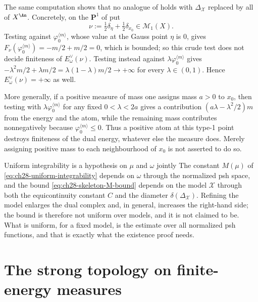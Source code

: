 \begin{example}
\label{ex:ch28-whole-space-not-admissible}
The same computation shows that no analogue of
 holds with $\Delta_{\mathcal X}$
replaced by all of $X^{\An}$.  Concretely, on the $\mathbf P^1$ of
 put
\[
 \nu:=\tfrac12\delta_\eta+\tfrac12\delta_{x_0}\in\mathcal M_1(X).
\]
Testing against $\varphi_0^{\langle m\rangle}$, whose value at the Gauss
point $\eta$ is $0$, gives
$F_\nu(\varphi_0^{\langle m\rangle})=-m/2+m/2=0$, which is bounded; so this
crude test does not decide finiteness of $E^\vee_\omega(\nu)$.  Testing
instead against $\lambda\varphi_0^{\langle m\rangle}$ gives
$-\lambda^2m/2+\lambda m/2=\lambda(1-\lambda)m/2\to+\infty$ for every
$\lambda\in(0,1)$.  Hence $E^\vee_\omega(\nu)=+\infty$ as well.

More generally, if a positive measure of mass one assigns mass $a>0$ to
$x_0$, then testing with $\lambda\varphi_0^{\langle m\rangle}$ for any
fixed $0<\lambda<2a$ gives a contribution
$(a\lambda-\lambda^2/2)m$ from the energy and the atom, while the remaining
mass contributes nonnegatively because
$\varphi_0^{\langle m\rangle}\leq0$.  Thus a positive atom at this type-1
point destroys finiteness of the dual energy, whatever else the measure
does.  Merely assigning positive mass to each neighbourhood of $x_0$ is
not asserted to do so.
\end{example}

\begin{warning}{Uniform integrability is a hypothesis on $\mu$ and
$\omega$ jointly}
The constant $M(\mu)$ of \eqref{eq:ch28-uniform-integrability} depends on
$\omega$ through the normalized psh space, and the bound
\eqref{eq:ch28-skeleton-M-bound} depends on the model $\mathcal X$ through
both the equicontinuity constant $C$ and the diameter
$\delta(\Delta_{\mathcal X})$.  Refining the model enlarges the dual
complex and, in general, increases the right-hand side; the bound is
therefore not uniform over models, and it is not claimed to be.  What is
uniform, for a fixed model, is the estimate over all normalized psh
functions, and that is exactly what the existence proof needs.
\end{warning}

\section{The strong topology on finite-energy measures}
\label{sec:ch28-strong-measures}


